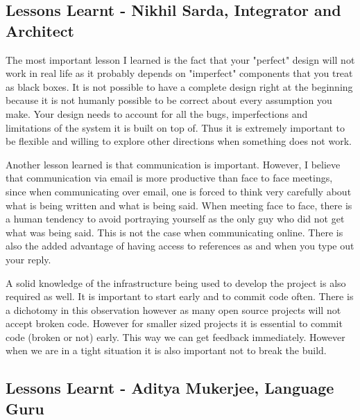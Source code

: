 \documentclass[letterpaper,11pt]{article}
\begin{document}
{\subsection{Lessons Learnt - Nikhil Sarda, Integrator and Architect}

The most important lesson I learned is the fact that your "perfect" design will not work in real life as it probably depends on "imperfect"
components that you treat as black boxes. It is not possible to have a complete design right at the beginning because it is not humanly possible to be correct about every assumption you make. Your design needs to account for all the bugs, imperfections and limitations of the system it is built on
top of. Thus it is extremely important to be flexible and willing to explore other directions when something does not work.

Another lesson learned is that communication is important. However, I believe that communication via email is more productive than face to face meetings, since when communicating over email, one is forced to think very carefully about what is being written and what is being said. When meeting face to face, there is a human tendency to avoid portraying yourself as the only guy who did not get what was being said. This is not the case when
communicating online. There is also the added advantage of having access to references as and when you type out your reply.

A solid knowledge of the infrastructure being used to develop the project is also required as well. It is important
to start early and to commit code often. There is a dichotomy in this observation however as many open source projects will not accept broken code.
However for smaller sized projects it is essential to commit code (broken or not) early. This way we can get feedback immediately.
However when we are in a tight situation it is also important not to break the build.

\subsection{Lessons Learnt - Aditya Mukerjee, Language Guru}

}
\end{document}
